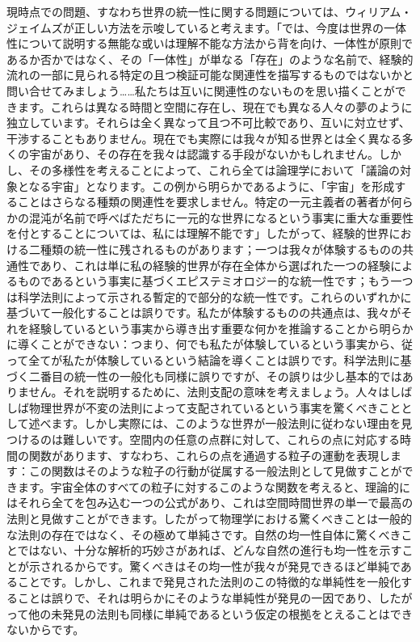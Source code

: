 \documentclass[a4paper,11pt,openany]{ltjsbook}
\begin{document}
現時点での問題、すなわち世界の統一性に関する問題については、ウィリアム・ジェイムズが正しい方法を示唆していると考えます。「では、今度は世界の一体性について説明する無能な或いは理解不能な方法から背を向け、一体性が原則であるか否かではなく、その「一体性」が単なる「存在」のような名前で、経験的流れの一部に見られる特定の且つ検証可能な関連性を描写するものではないかと問い合せてみましょう……私たちは互いに関連性のないものを思い描くことができます。これらは異なる時間と空間に存在し、現在でも異なる人々の夢のように独立しています。それらは全く異なって且つ不可比較であり、互いに対立せず、干渉することもありません。現在でも実際には我々が知る世界とは全く異なる多くの宇宙があり、その存在を我々は認識する手段がないかもしれません。しかし、その多様性を考えることによって、これら全ては論理学において「議論の対象となる宇宙」となります。この例から明らかであるように、「宇宙」を形成することはさらなる種類の関連性を要求しません。特定の一元主義者の著者が何らかの混沌が名前で呼べばただちに一元的な世界になるという事実に重大な重要性を付とすることについては、私には理解不能です」したがって、経験的世界における二種類の統一性に残されるものがあります；一つは我々が体験するものの共通性であり、これは単に私の経験的世界が存在全体から選ばれた一つの経験によるものであるという事実に基づくエピステミオロジー的な統一性です；もう一つは科学法則によって示される暫定的で部分的な統一性です。これらのいずれかに基づいて一般化することは誤りです。私たが体験するものの共通点は、我々がそれを経験しているという事実から導き出す重要な何かを推論することから明らかに導くことができない：つまり、何でも私たが体験しているという事実から、従って全てが私たが体験しているという結論を導くことは誤りです。科学法則に基づく二番目の統一性の一般化も同様に誤りですが、その誤りは少し基本的ではありません。それを説明するために、法則支配の意味を考えましょう。人々はしばしば物理世界が不変の法則によって支配されているという事実を驚くべきこととして述べます。しかし実際には、このような世界が一般法則に従わない理由を見つけるのは難しいです。空間内の任意の点群に対して、これらの点に対応する時間の関数があります、すなわち、これらの点を通過する粒子の運動を表現します：この関数はそのような粒子の行動が従属する一般法則として見做すことができます。宇宙全体のすべての粒子に対するこのような関数を考えると、理論的にはそれら全てを包み込む一つの公式があり、これは空間時間世界の単一で最高の法則と見做すことができます。したがって物理学における驚くべきことは一般的な法則の存在ではなく、その極めて単純さです。自然の均一性自体に驚くべきことではない、十分な解析的巧妙さがあれば、どんな自然の進行も均一性を示すことが示されるからです。驚くべきはその均一性が我々が発見できるほど単純であることです。しかし、これまで発見された法則のこの特徴的な単純性を一般化することは誤りで、それは明らかにそのような単純性が発見の一因であり、したがって他の未発見の法則も同様に単純であるという仮定の根拠をとえることはできないからです。
\end{document}
